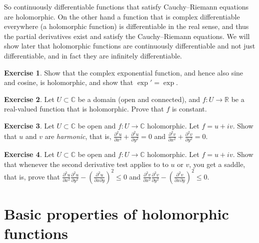 \documentclass[12pt,openany]{book}
\newcommand{\C}{{\mathbb{C}}}
\newcommand{\R}{{\mathbb{R}}}
\newcommand{\myindex}[1]{#1\index{#1}}
\theoremstyle{plain}
\theoremstyle{remark}
\theoremstyle{definition}
\newenvironment{exbox}{%
    \def\FrameCommand{\vrule width 1pt \relax\hspace {10pt}}%
    \MakeFramed {\advance \hsize -\width \FrameRestore }%
}{%
    \endMakeFramed
}
\theoremstyle{exercise}
\newtheorem{exercise}{Exercise}[section]
\theoremstyle{example}
\begin{document}
So continuously differentiable functions that satisfy
Cauchy--Riemann equations are holomorphic.
On the other hand
a function that is complex differentiable everywhere (a holomorphic
function) is differentiable in the real sense,
and thus the partial derivatives exist and satisfy the Cauchy--Riemann
equations.  We will show later that holomorphic functions are
continuously differentiable and not just differentiable, and in fact they
are infinitely differentiable.

\begin{exbox}
\begin{exercise} \label{exercise:exponentialholomorphic}
Show that the complex exponential function, and hence also sine and cosine,
is holomorphic, and show that $\exp' = \exp$.
\end{exercise}

\begin{exercise}
Let $U \subset \C$ be a domain (open and connected),
and $f \colon U \to \R$ be a real-valued function that is holomorphic.
Prove that $f$ is constant.
\end{exercise}

\begin{exercise}
Let $U \subset \C$ be open and $f \colon U \to \C$ holomorphic.
Let $f = u+iv$.  Show that $u$ and $v$ are \emph{\myindex{harmonic}},
that is,
$\frac{\partial^2 u}{\partial x^2} +  \frac{\partial^2 u}{\partial y^2} = 0$
and
$\frac{\partial^2 v}{\partial x^2} +  \frac{\partial^2 v}{\partial y^2} = 0$.
\end{exercise}

\begin{exercise}
Let $U \subset \C$ be open and $f \colon U \to \C$ holomorphic.
Let $f = u+iv$.  Show that whenever the second derivative test applies to
to $u$ or $v$, you get a saddle, that is, prove that
$\frac{\partial^2 u}{\partial x^2} \frac{\partial^2 u}{\partial y^2}
-{\left(\frac{\partial^2 u}{\partial x \partial y}\right)}^2 \leq 0$
and
$\frac{\partial^2 v}{\partial x^2} \frac{\partial^2 v}{\partial y^2}
-{\left(\frac{\partial^2 v}{\partial x \partial y}\right)}^2 \leq 0$.
\end{exercise}
\end{exbox}



\section{Basic properties of holomorphic functions}
\end{document}

